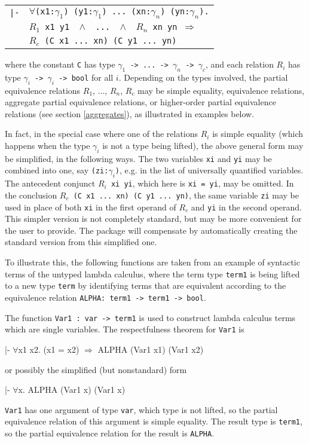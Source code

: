 \documentclass[envcountsame,runningheads]{llncs}
\newcommand{\quotient}{partial equivalence}
\begin{document}
\begin{center}
\begin{tabular}{rl}
{\tt |-}&
{\tt $\forall$(x1:$\gamma_1$) (y1:$\gamma_1$) ... (xn:$\gamma_n$) (yn:$\gamma_n$).}
\\
& \hspace{12mm}
{\tt $R_1$ x1 y1 \
$\wedge$ \ 
... \
$\wedge$ \ 
$R_n$ xn yn $\Rightarrow$
}  \\
& \hspace{12mm}
{\tt $R_c$ (C x1 ... xn) (C y1 ... yn)}  \\
\end{tabular}
\end{center}
where the constant {\tt C} has type
{\tt $\gamma_1$ -> ... -> $\gamma_n$ -> $\gamma_c$},
and each relation {\tt $R_i$} has type {\tt $\gamma_i$ -> $\gamma_i$ -> bool}
for all $i$.
Depending on the types involved, 
the \quotient{} relations $R_1$, ..., $R_n$, $R_c$
may be simple equality, equivalence relations,
aggregate \quotient{} relations,
or higher-order \quotient{} relations (see section \ref{aggregates}),
as illustrated in examples below.

In fact, in the special case where one of the relations $R_i$ is simple
equality (which happens when the type
$\gamma_i$ is not a type being lifted),
the above general form may be simplified, in the following ways.
The two variables {\tt xi} and {\tt yi} may be combined into one,
say {\tt (zi:$\gamma_i$)}, e.g. in the list of universally quantified variables.
The antecedent conjunct {\tt $R_i$ xi yi}, which here is {\tt xi = yi},
may be omitted.  In the conclusion {\tt $R_c$ (C x1 ... xn) (C y1 ... yn)},
the same variable {\tt zi} may be used in place of both {\tt xi} in the first
operand of {\tt $R_c$} and {\tt yi} in the second operand.  This simpler
version is not completely standard, but may be more convenient for
the user to provide.  The package will compensate by automatically
creating the standard version from this simplified one.

To illustrate this, the following functions are taken from an example
of syntactic terms of the untyped lambda calculus,
where the term type {\tt term1}
is being lifted to a new type {\tt term}
by identifying terms that are equivalent
according to the equivalence relation {\tt ALPHA: term1 -> term1 -> bool}.

The function {\tt Var1 : var -> term1} is used to construct
lambda calculus terms which are single variables. 
The respectfulness theorem for {\tt Var1} is
{\tt \begin{tabbing}
\hspace{5.5mm}
    |- $\forall$x1 x2. (x1 = x2) $\Rightarrow$ ALPHA (Var1 x1) (Var1 x2)
\end{tabbing}}
or possibly the simplified (but nonstandard) form
{\tt \begin{tabbing}
\hspace{5.5mm}
    |- $\forall$x. ALPHA (Var1 x) (Var1 x)
\end{tabbing}}
{\tt Var1} has one argument of type {\tt var}, which type is not lifted,
so the \quotient{} relation of this argument is simple equality.
The result type is {\tt term1}, so the \quotient{} relation for the
result is {\tt ALPHA}. 
\end{document}
